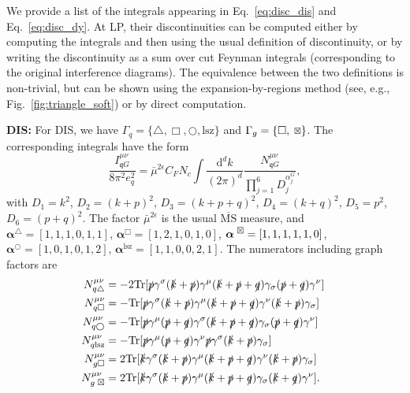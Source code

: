 \documentclass[%
 reprint,
 amsmath,amssymb,
 superscriptaddress,
 aps,
 preprintnumbers,
prl,
floatfix,
]{revtex4-2}
\DeclareRobustCommand{\timesbox}{%
  \mathbin{%
    \scalebox{0.8}{
    \ooalign{%
      $\Box$\cr
      \hfil\raisebox{0.2ex}{$\times$}\hfil\cr %
    }%
    }
  }%
}
\begin{document}
We provide a list of the integrals appearing in Eq.~\eqref{eq:disc_dis} and Eq.~\eqref{eq:disc_dy}.
At LP, their discontinuities can be computed either by computing the integrals and then using the usual definition of discontinuity, or by writing the discontinuity as a sum over cut Feynman integrals (corresponding to the original interference diagrams). The equivalence between the two definitions is non-trivial, but can be shown using the expansion-by-regions method (see, e.g., Fig.~\ref{fig:triangle_soft}) or by direct computation.   





\textbf{DIS:} For DIS, we have $\Gamma_{q}=\{\triangle,\Box,\bigcirc,\text{lsz}\}$ and $\Gamma_{g}=\{\Box,\timesbox\}$.
The corresponding integrals have the form
\begin{equation}
\frac{I^{\mu\nu}_{\mathfrak{q}G}}{8\pi^2 e_q^2}= \bar{\mu}^{2\epsilon}C_FN_c \int \frac{\mathrm{d}^d k}{(2\pi)^d} \frac{N_{\mathfrak{q}G}^{\mu\nu}}{\prod_{j=1}^6 D_j^{\alpha_j^G}},
\end{equation}
with $D_1=k^2$, $D_2=(k+p)^2$, $D_3=(k+p+q)^2$, $D_4=(k+q)^2$, $D_5=p^2$, $D_6=(p+q)^2$.
The factor $\bar{\mu}^{2\epsilon}$ is the usual $\overline{\text{MS}}$ measure, and $\boldsymbol{\alpha}^\triangle=[1,1,1,0,1,1]$, $\boldsymbol{\alpha}^\Box=[1,2,1,0,1,0]$, $\boldsymbol{\alpha}^{\timesbox}=[1,1,1,1,1,0]$, $\boldsymbol{\alpha}^{\bigcirc}=[1,0,1,0,1,2]$, $\boldsymbol{\alpha}^{\text{lsz}}=[1,1,0,0,2,1]$.
The numerators including graph factors are
\begin{align}
\hspace{-0.1cm}N_{q\triangle}^{\mu\nu}&=-2\text{Tr}[\slashed{p}\gamma^\sigma (\slashed{k}+\slashed{p}) \gamma^\mu (\slashed{k}+\slashed{p}+\slashed{q})\gamma_\sigma (\slashed{p}+\slashed{q})\gamma^\nu]\\
\hspace{-0.1cm}N_{q\Box}^{\mu\nu}&=-\text{Tr}[\slashed{p}\gamma^\sigma (\slashed{k}+\slashed{p}) \gamma^\mu (\slashed{k}+\slashed{p}+\slashed{q})\gamma^\nu (\slashed{k}+\slashed{p})\gamma_\sigma]\\
\hspace{-0.1cm}N_{q\bigcirc}^{\mu\nu}&=-\text{Tr}[\slashed{p}\gamma^\mu (\slashed{p}+\slashed{q}) \gamma^\sigma (\slashed{k}+\slashed{p}+\slashed{q})\gamma_\sigma (\slashed{p}+\slashed{q})\gamma^\nu] \\
\hspace{-0.1cm}N_{q\text{lsz}}^{\mu\nu}&=-\text{Tr}[\slashed{p}\gamma^\mu (\slashed{p}+\slashed{q}) \gamma^\nu \slashed{p} \gamma^\sigma (\slashed{k}+\slashed{p})\gamma_\sigma]\\
\hspace{-0.1cm}N_{g\Box}^{\mu\nu}&=2\text{Tr}[\slashed{k}\gamma^\sigma (\slashed{k}+\slashed{p}) \gamma^\mu (\slashed{k}+\slashed{p}+\slashed{q})\gamma^\nu (\slashed{k}+\slashed{p})\gamma_\sigma]\\
\hspace{-0.1cm}N_{g\timesbox}^{\mu\nu}&=2\text{Tr}[\slashed{k}\gamma^\sigma (\slashed{k}+\slashed{p}) \gamma^\mu (\slashed{k}+\slashed{p}+\slashed{q})\gamma_\sigma (\slashed{k}+\slashed{q})\gamma^\nu].
\end{align}
\end{document}
